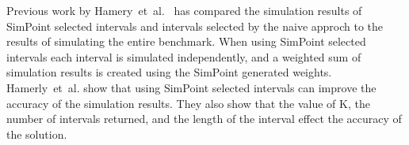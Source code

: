 Previous work by Hamery~et~al.~\cite{Hamerly2004} has compared the simulation results of SimPoint selected intervals and intervals selected by the naive approch to the results of simulating the entire benchmark.
When using SimPoint selected intervals each interval is simulated independently, and a weighted sum of simulation results is created using the SimPoint generated weights.
Hamerly~et~al. show that using SimPoint selected intervals can improve the accuracy of the simulation results. 
They also show that the value of K, the number of intervals returned, and the length of the interval effect the accuracy of the solution. 
